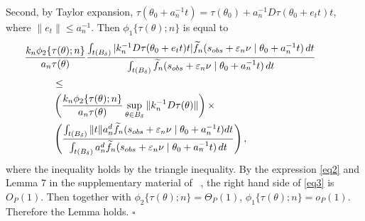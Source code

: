 	Second, by Taylor expansion, $\tau(\theta_0+a_{n}^{-1}t)=\tau(\theta_0)+a_{n}^{-1}D\tau(\theta_0+e_{t}t)t$,
	where $\|e_{t}\|\leq a_{n}^{-1}$. Then $\phi_{1}\{\tau(\theta);n\}$ is equal to
	\begin{eqnarray}
         &\hspace{-1cm}\frac{k_{n}\phi_{2}\{\tau(\theta);n\}}{a_{n}\tau(\theta)}\frac{\int_{t(B_{\delta})}|k_{n}^{-1}D\tau(\theta_0+e_{t}t)t|\ftil_{n}(s_{{\rm obs}}+\veps_{n}\nu\mid\theta_0+a_{n}^{-1}t)\,dt}{\int_{t(B_{\delta})}\ftil_{n}(s_{{\rm obs}}+\veps_{n}\nu\mid\theta_0+a_{n}^{-1}t)\,dt} \nonumber\\
           &\leq  \nonumber \\
	    &\left( \frac{k_{n}\phi_{2}\{\tau(\theta);n\}}{a_{n}\tau(\theta)}\sup_{\theta\in B_{\delta}}\|k_{n}^{-1}D\tau(\theta)\| \right) \times \nonumber \\
	    &\left(\frac{\int_{t(B_{\delta})}\|t\|a_{n}^{d}\ftil_{n}(s_{{\rm obs}}+\veps_{n}\nu\mid\theta_0+a_{n}^{-1}t)dt}{\int_{t(B_{\delta})}a_{n}^{d}\ftil_{n}(s_{{\rm obs}}+\veps_{n}\nu\mid\theta_0+a_{n}^{-1}t)\,dt}\right),\label{eq3}
	\end{eqnarray}
	where the inequality holds by the triangle inequality. By the expression
	\eqref{eq2} and Lemma 7 in the supplementary material of ~\cite{Li2016},
	the right hand side of \eqref{eq3} is $O_{P}(1)$. Then together
	with $\phi_{2}\{\tau(\theta);n\}=\Theta_{P}(1)$, $\phi_{1}\{\tau(\theta);n\}=o_{P}(1).$
	Therefore the Lemma holds.
	\hfill{$\square$} 
 
